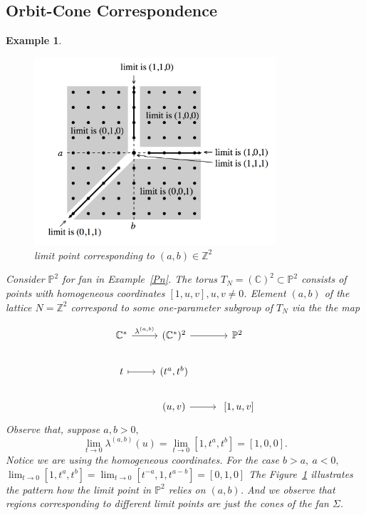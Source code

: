 \documentclass[11pt]{article}
\newtheorem{ex}[thm]{Example}
\newcommand{\cplx}{\mathbb C}
\newcommand{\intg}{\mathbb Z}
\begin{document}
\subsection{Orbit-Cone Correspondence}
\begin{ex}
	\begin{figure}
	\centering
	\includegraphics[width = 0.8\textwidth]{limit}
	\caption{limit point corresponding to $(a,b)\in \intg^2$}\label{fig:limit}
\end{figure}
	Consider $\mathbb{P}^2$ for fan in Example~\ref{Pn}. The torus $T_N=(\cplx)^2\subset\mathbb{P}^2$ consists of points with homogeneous coordinates $[1,u,v], u,v\neq0$. Element $(a, b)$ of the lattice $N=\intg^2$ correspond to some one-parameter subgroup of $T_N$ via the the map

	\[ \begin{tikzcd}
	\cplx^* \arrow{r}{\lambda^{(a,b)}} & (\cplx^*)^2 \arrow{r} & \mathbb{P}^2\\%
	t \arrow[r,mapsto]		& (t^a, t^b) & \\
	\ & (u,v)\arrow[r] & \ [1,u,v]
	\end{tikzcd}\]	
	Observe that, suppose $a,b>0,$
		\begin{equation*}
			\lim_{t\rightarrow0} \lambda^{(a,b)}(u)=\lim_{t\rightarrow0}[1, t^a,t^b]=[1,0,0].
		\end{equation*}
		Notice we are using the homogeneous coordinates.
		For the case $b>a,\ a<0,$ $\lim_{t\rightarrow0}[1,t^a,t^b]=\lim_{t\rightarrow 0}[t^{-a},1,t^{a-b}]=[0,1,0]$
	The Figure~\ref{fig:limit} illustrates the pattern how the limit point in $\mathbb{P}^2$ relies on $(a,b)$. And we observe that regions corresponding to different limit points are just the cones of the fan $\Sigma$.
\end{ex}
\end{document}

